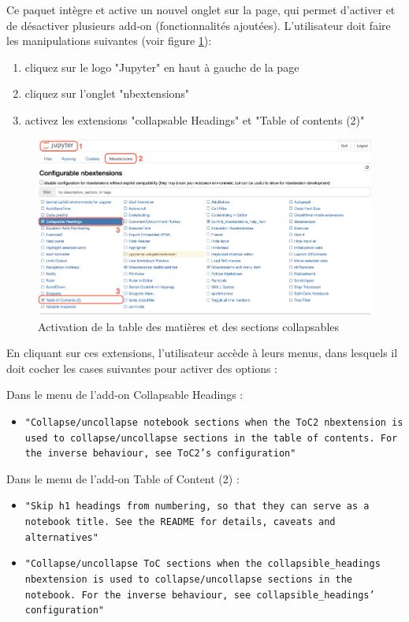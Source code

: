 \documentclass[a4paper,12pt,twoside]{book}
\begin{document}
Ce paquet intègre et active un nouvel onglet sur la page, qui permet d'activer et de désactiver plusieurs add-on (fonctionnalités ajoutées). L'utilisateur doit faire les manipulations suivantes (voir figure \ref{confignextensions}):
\begin{enumerate}
	\item cliquez sur le logo "Jupyter" en haut à gauche de la page
	\item cliquez sur l'onglet "nbextensions"
	\item activez les extensions "collapsable Headings" et "Table of contents (2)"
\end{enumerate}

\begin{figure}[ht]
	\centering
	\includegraphics[scale=0.4]{jupyter_extensions_1.png}		
	\caption{Activation de la table des matières et des sections collapsables}
	\label{confignextensions}
\end{figure}

En cliquant sur ces extensions, l'utilisateur accède à leurs menus, dans lesquels il doit cocher les cases suivantes pour activer des options :

Dans le menu de l'add-on Collapsable Headings :

\begin{itemize}
	\item \texttt{"Collapse/uncollapse notebook sections when the ToC2 nbextension is used to collapse/uncollapse sections in the table of contents. For the inverse behaviour, see ToC2's configuration"}
\end{itemize}

Dans le menu de l'add-on Table of Content (2) :
\begin{itemize}
	\item \texttt{"Skip h1 headings from numbering, so that they can serve as a notebook title. See the README for details, caveats and alternatives"}
	\item \texttt{"Collapse/uncollapse ToC sections when the collapsible\_headings nbextension is used to collapse/uncollapse sections in the notebook. For the inverse behaviour, see collapsible\_headings' configuration"}
\end{itemize}
\end{document}
